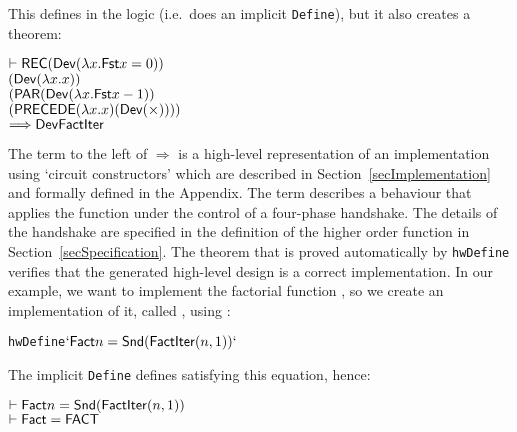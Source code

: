 \documentclass{llncs}
\begin{document}
\vspace*{-2mm}

\noindent This defines  in the logic (i.e.~does an
implicit \texttt{Define}), but it also creates a theorem:

\vspace*{-2mm}

{\baselineskip10pt\begin{alltt}
\( \vdash \DEF{REC} (\DEF{Dev} ({\lambda}x. \DEF{Fst} x = 0))         \) 
\(        (\DEF{Dev} ({\lambda}x. x))                                 \)
\(        (\DEF{PAR} (\DEF{Dev} ({\lambda}x. \DEF{Fst} x - 1))        \)
\(             (\DEF{PRECEDE} ({\lambda}x. x) (\DEF{Dev}({\times})))) \)
\(    \Longrightarrow \DEF{Dev} \DEF{FactIter}                        \)
\end{alltt}}

\vspace*{-2mm}

\noindent The term to the left of $\Longrightarrow$ is a high-level
representation of an implementation using `circuit constructors' which
are described in Section~\ref{secImplementation} and formally defined in the
Appendix.  The term  describes a behaviour that
applies the function  under the control of a four-phase
handshake. The details of the handshake are specified in the
definition of the higher order function  in
Section~\ref{secSpecification}. The theorem that is proved
automatically by
\texttt{hwDefine} verifies that the generated high-level design is a correct
implementation. In our example, we want to implement the factorial
function , so we create an implementation of it, called
, using :

\vspace*{-2mm}

{\baselineskip10pt\begin{alltt}
 hwDefine\( `\DEF{Fact} n = \DEF{Snd}(\DEF{FactIter} (n,1))`  \)
\end{alltt}}

\vspace*{-2mm}

\noindent The implicit \texttt{Define} defines  satisfying this equation, hence:

\vspace*{-2mm}

{\baselineskip14pt\begin{alltt}
\( \vdash \DEF{Fact} n = \DEF{Snd}(\DEF{FactIter}(n,1)) \)
\( \vdash \DEF{Fact} = \DEF{FACT}                       \)
\end{alltt}}
\end{document}
